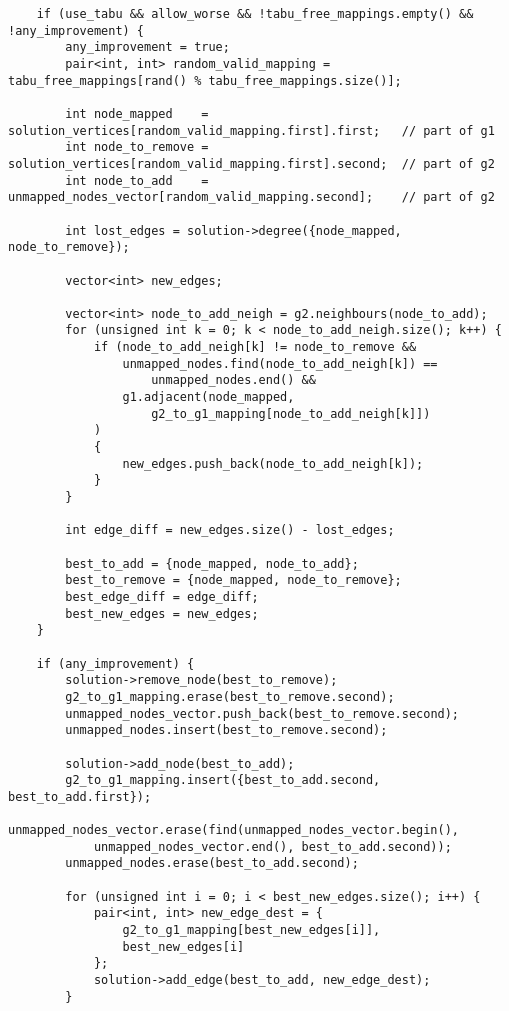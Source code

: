\begin{lstlisting}
    if (use_tabu && allow_worse && !tabu_free_mappings.empty() && !any_improvement) {
        any_improvement = true;
        pair<int, int> random_valid_mapping = tabu_free_mappings[rand() % tabu_free_mappings.size()];

        int node_mapped    = solution_vertices[random_valid_mapping.first].first;   // part of g1
        int node_to_remove = solution_vertices[random_valid_mapping.first].second;  // part of g2
        int node_to_add    = unmapped_nodes_vector[random_valid_mapping.second];    // part of g2

        int lost_edges = solution->degree({node_mapped, node_to_remove});

        vector<int> new_edges;

        vector<int> node_to_add_neigh = g2.neighbours(node_to_add);
        for (unsigned int k = 0; k < node_to_add_neigh.size(); k++) {
            if (node_to_add_neigh[k] != node_to_remove &&
                unmapped_nodes.find(node_to_add_neigh[k]) ==
                    unmapped_nodes.end() &&
                g1.adjacent(node_mapped,
                    g2_to_g1_mapping[node_to_add_neigh[k]])
            )
            {
                new_edges.push_back(node_to_add_neigh[k]);
            }
        }

        int edge_diff = new_edges.size() - lost_edges;

        best_to_add = {node_mapped, node_to_add};
        best_to_remove = {node_mapped, node_to_remove};
        best_edge_diff = edge_diff;
        best_new_edges = new_edges;
    }

    if (any_improvement) {
        solution->remove_node(best_to_remove);
        g2_to_g1_mapping.erase(best_to_remove.second);
        unmapped_nodes_vector.push_back(best_to_remove.second);
        unmapped_nodes.insert(best_to_remove.second);

        solution->add_node(best_to_add);
        g2_to_g1_mapping.insert({best_to_add.second, best_to_add.first});
        unmapped_nodes_vector.erase(find(unmapped_nodes_vector.begin(),
            unmapped_nodes_vector.end(), best_to_add.second));
        unmapped_nodes.erase(best_to_add.second);

        for (unsigned int i = 0; i < best_new_edges.size(); i++) {
            pair<int, int> new_edge_dest = {
                g2_to_g1_mapping[best_new_edges[i]],
                best_new_edges[i]
            };
            solution->add_edge(best_to_add, new_edge_dest);
        }


\end{lstlisting}
